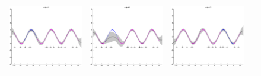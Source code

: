 \begin{figure}
\centering
\begin{tabular}{cccc}
\includegraphics[scale=0.25]{figures/toy-slfm-y1.eps} &
\includegraphics[scale=0.25]{figures/toy-svigp-y1.eps} &
\includegraphics[scale=0.25]{figures/toy-slfm-y2.eps} &

\end{tabular}
\end{figure}
